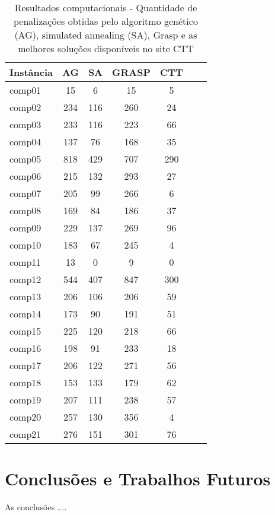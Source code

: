 \documentclass[11pt]{article}
\begin{document}
\begin{table}

\centering
\begin{tabular}{|l|c|c|c|c|c|c|} 
\hline

Instância & AG & SA & GRASP & CTT &  \\ \hline

comp01 & 15 & 6 & 15 & 5 & \\
comp02 & 234 & 116 & 260 & 24 & \\
comp03 & 233 & 116 & 223 & 66 & \\
comp04 & 137 & 76 & 168 & 35 & \\
comp05 & 818 & 429 & 707 & 290 & \\
comp06 & 215 & 132 & 293 & 27 & \\
comp07 & 205 & 99 & 266 & 6 & \\
comp08 & 169 & 84 & 186 & 37 & \\
comp09 & 229 & 137 & 269 & 96 & \\
comp10 & 183 & 67 & 245 & 4 & \\
comp11 & 13 & 0 & 9 & 0 & \\
comp12 & 544 & 407 & 847 & 300 & \\
comp13 & 206 & 106 & 206 & 59 & \\
comp14 & 173 & 90 & 191 & 51 & \\
comp15 & 225 & 120 & 218 & 66 & \\
comp16 & 198 & 91 & 233 & 18 & \\
comp17 & 206 & 122 & 271 & 56 & \\
comp18 & 153 & 133 & 179 & 62 & \\
comp19 & 207 & 111 & 238 & 57 & \\
comp20 & 257 & 130 & 356 & 4 & \\
comp21 & 276 & 151 & 301 & 76 & \\
\hline
\end{tabular}
\caption{Resultados computacionais - Quantidade de penalizações obtidas pelo algoritmo genético (AG), simulated annealing (SA), Grasp e as melhores soluções disponíveis no site CTT}
\label{tabResultados}
\end{table} 


\section{Conclusões e Trabalhos Futuros}
\label{sec:conclusao}

As conclusões ....
\end{document}
